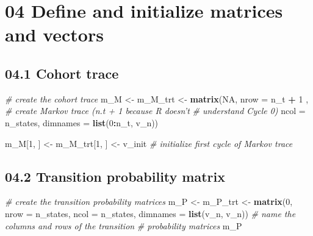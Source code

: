 \documentclass[
]{article}
\newenvironment{Shaded}{\begin{snugshade}}{\end{snugshade}}
\newcommand{\CommentTok}[1]{\textcolor[rgb]{0.56,0.35,0.01}{\textit{#1}}}
\newcommand{\DataTypeTok}[1]{\textcolor[rgb]{0.13,0.29,0.53}{#1}}
\newcommand{\DecValTok}[1]{\textcolor[rgb]{0.00,0.00,0.81}{#1}}
\newcommand{\KeywordTok}[1]{\textcolor[rgb]{0.13,0.29,0.53}{\textbf{#1}}}
\newcommand{\NormalTok}[1]{#1}
\newcommand{\OperatorTok}[1]{\textcolor[rgb]{0.81,0.36,0.00}{\textbf{#1}}}
\newcommand{\OtherTok}[1]{\textcolor[rgb]{0.56,0.35,0.01}{#1}}
\newcommand{\StringTok}[1]{\textcolor[rgb]{0.31,0.60,0.02}{#1}}
\begin{document}
\hypertarget{define-and-initialize-matrices-and-vectors}{%
\section{04 Define and initialize matrices and
vectors}\label{define-and-initialize-matrices-and-vectors}}

\hypertarget{cohort-trace}{%
\subsection{04.1 Cohort trace}\label{cohort-trace}}

\begin{Shaded}
\begin{Highlighting}[]
\CommentTok{# create the cohort trace}
\NormalTok{m_M <-}\StringTok{ }\NormalTok{m_M_trt <-}\StringTok{  }\KeywordTok{matrix}\NormalTok{(}\OtherTok{NA}\NormalTok{, }
                         \DataTypeTok{nrow =}\NormalTok{ n_t }\OperatorTok{+}\StringTok{ }\DecValTok{1}\NormalTok{ ,  }\CommentTok{# create Markov trace (n.t + 1 because R doesn't }
                                           \CommentTok{# understand Cycle 0)}
                         \DataTypeTok{ncol =}\NormalTok{ n_states, }
                        \DataTypeTok{dimnames =} \KeywordTok{list}\NormalTok{(}\DecValTok{0}\OperatorTok{:}\NormalTok{n_t, v_n))}

\NormalTok{m_M[}\DecValTok{1}\NormalTok{, ] <-}\StringTok{ }\NormalTok{m_M_trt[}\DecValTok{1}\NormalTok{, ] <-}\StringTok{ }\NormalTok{v_init         }\CommentTok{# initialize first cycle of Markov trace}
\end{Highlighting}
\end{Shaded}

\hypertarget{transition-probability-matrix}{%
\subsection{04.2 Transition probability
matrix}\label{transition-probability-matrix}}

\begin{Shaded}
\begin{Highlighting}[]
\CommentTok{# create the transition probability matrices}
\NormalTok{m_P  <-}\StringTok{ }\NormalTok{m_P_trt <-}\StringTok{ }\KeywordTok{matrix}\NormalTok{(}\DecValTok{0}\NormalTok{,}
                    \DataTypeTok{nrow =}\NormalTok{ n_states, }\DataTypeTok{ncol =}\NormalTok{ n_states,}
                    \DataTypeTok{dimnames =} \KeywordTok{list}\NormalTok{(v_n, v_n))  }\CommentTok{# name the columns and rows of the transition }
                                                \CommentTok{# probability matrices}
\NormalTok{m_P}
\end{Highlighting}
\end{Shaded}
\end{document}
